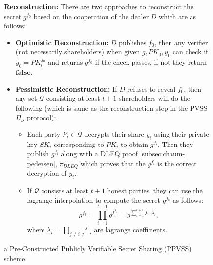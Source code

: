\begin{figure}[t!]
{\begin{tcolorbox}[title=\textbf{$\Lambda_{RO}$ \cite{cryptoeprint:2025/576}}, width=1.2\textwidth, colframe=blue!75!black, colback=blue!10, sharp corners]
        \vspace{0.5em}
        \textbf{Reconstruction:}
            There are two approaches to reconstruct the secret $g^{f_0}$ based on the 
            cooperation of the dealer $D$ which are as follows:
            \begin{itemize}
                \item \textbf{Optimistic Reconstruction:} $D$ publishes $f_0$, then any verifier (not necessarily shareholders) 
                when given $g,PK_0,y_0$ can check if $y_0=PK_0^{f_0}$ and returns $g^{f_0}$ 
                if the check passes, if not they return \textbf{false}.
                \item \textbf{Pessimistic Reconstruction:} If $D$ refuses to reveal $f_0$, then any set 
                $\mathcal{Q}$ consisting at least $t+1$ shareholders will do the following (which 
                is same as the reconstruction step in the PVSS $\Pi_S$ protocol):
                \begin{itemize}
                    \item Each party $P_i\in\mathcal{Q}$ decrypts their share $y_i$ using their private key $SK_i$ 
                      corresponding to $PK_i$ to obtain $g^{f_i}$. Then they publish $g^{f_i}$ 
                      along with a DLEQ proof \ref{subsec:chaum-pedersen}, $\pi_{DLEQ}$ which proves that the 
                       $g^{f_i}$ is the correct decryption of $y_i$.
                    \item If $\mathcal{Q}$ consists at least $t+1$ honest parties, they can use the 
                    lagrange interpolation to compute the secret $g^{f_0}$ as follows:
                      $$ \textstyle g^{f_0} = \prod_{i=1}^{t+1} g^{f_i^{\lambda_i}} = g^{\sum_{i=1}^{t+1}f_i\cdot\lambda_i},$$
                    where $\lambda_i=\prod_{j\neq i}\frac{j}{j-i}$ are lagrange coefficients.
                \end{itemize}
            \end{itemize}
    \end{tcolorbox}
    }
    \caption[PPVSS Scheme]{a Pre-Constructed Publicly Verifiable Secret Sharing (PPVSS) scheme}
    \label{fig:ppvss}
\end{figure}